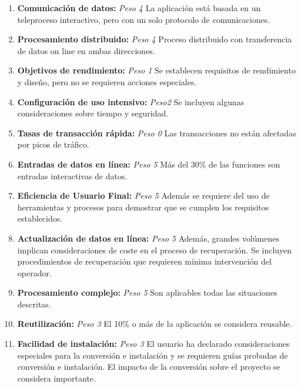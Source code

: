 \documentclass[11pt,a4paper,spanish,twoside]{book}
\begin{document}
\begin{enumerate}[{\bf 1.}]

\item {\bf Comunicación de datos:} \emph{Peso 4} La aplicación está basada en
  un teleproceso interactivo, pero con un solo protocolo de comunicaciones.

\item {\bf Procesamiento distribuido:} \emph{Peso 4} Proceso distribuido
  con transferencia de datos on line en ambas direcciones. 

\item {\bf Objetivos de rendimiento:} \emph{Peso 1} Se establecen requisitos
  de rendimiento y diseño, pero no se requieren acciones especiales.

\item {\bf Configuración de uso intensivo:} \emph{Peso2} Se incluyen algunas
  consideraciones sobre tiempo y seguridad. 

\item {\bf Tasas de transacción rápida:} \emph{Peso 0} Las transacciones no
  están afectadas por picos de tráfico. 

\item {\bf Entradas de datos en línea:} \emph{Peso 5} Más del 30\% de las
  funciones son entradas interactivas de datos. 

\item {\bf Eficiencia de Usuario Final:} \emph{Peso 5} Además se requiere del
  uso de herramientas y procesos para demostrar que se cumplen los requisitos
  establecidos.

\item {\bf Actualización de datos en línea:} \emph{Peso 5} Además, grandes
  volúmenes implican consideraciones de coste en el proceso de
  recuperación. Se incluyen procedimientos de recuperación que requieren
  mínima intervención del operador. 

\item {\bf Procesamiento complejo:} \emph{Peso 5} Son aplicables todas las
  situaciones descritas.
 
\item {\bf Reutilización:} \emph{Peso 3} El 10\% o más de la aplicación se
  considera reusable. 

\item {\bf Facilidad de instalación:} \emph{Peso 3} El usuario ha declarado
  consideraciones especiales para la conversión e instalación y se requieren
  guías probadas de conversión e instalación. El impacto de la conversión
  sobre el proyecto se considera importante. 


\end{enumerate}
\end{document}
